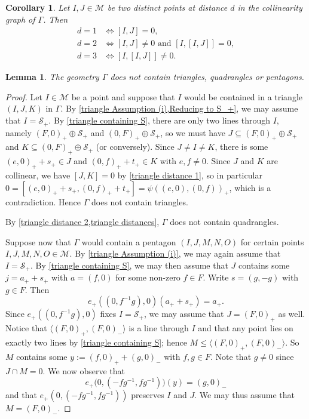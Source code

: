 \documentclass[oneside,a4paper]{amsart} %
\newtheorem{lemma}[theorem]{Lemma}
\newtheorem{corollary}[theorem]{Corollary}
\theoremstyle{definition}
\renewcommand{\SS}{\mathcal{S}}
\newcommand{\M}{\mathcal{M}}
\numberwithin{equation}{section}
\begin{document}
\begin{corollary}
\label{triangle distances}
	Let $I,J\in\M$ be two distinct points at distance $d$ in the collinearity graph of $\Gamma$. Then
	\begin{align*}
	   d = 1 &\iff [I,J]=0, \\
	   d = 2 &\iff [I,J]\neq 0 \text{ and } [I,[I,J]]=0, \\
	   d = 3 &\iff [I,[I,J]]\neq 0.
	\end{align*}
\end{corollary}

\begin{lemma}
\label{triangle no n-gons}
	The geometry $\Gamma$ does not contain triangles, quadrangles or pentagons.
\end{lemma}
\begin{proof}
    Let $I \in \M$ be a point and suppose that $I$ would be contained in a triangle $(I,J,K)$ in $\Gamma$.
    By \cref{triangle Assumption (i),Reducing to S_+}, we may assume that $I = \SS_+$.
	By \cref{triangle containing S}, there are only two lines through $I$, namely $(F,0)_+ \oplus \SS_+$ and $(0,F)_+ \oplus \SS_+$,
	so we must have $J \subseteq (F,0)_+ \oplus \SS_+$ and $K \subseteq (0,F)_+ \oplus \SS_+$ (or conversely).
	Since $J \neq I \neq K$, there is some $(e,0)_+ + s_+ \in J$ and $(0,f)_+ + t_+ \in K$ with $e,f \neq 0$.
	Since $J$ and $K$ are collinear, we have $[J,K] = 0$ by \cref{triangle distance 1}, so in particular
	$0 = [(e,0)_+ + s_+, (0,f)_+ + t_+] = \psi((e,0),(0,f))_+$, which is a contradiction.
	Hence $\Gamma$ does not contain triangles.
	
	By \cref{triangle distance 2,triangle distances}, $\Gamma$ does not contain quadrangles.
	
	Suppose now that $\Gamma$ would contain a pentagon $(I,J,M,N,O)$ for certain points $I,J,M,N,O \in \M$.
	By \cref{triangle Assumption (i)}, we may again assume that $I=\SS_+$.
    By \cref{triangle containing S}, we may then assume that $J$ contains some $j = a_+ + s_+$ with $a=(f,0)$ for some non-zero $f\in F$.
    Write $s=(g,-g)$ with $g\in F$.
    Then
    \[ e_+((0,f^{-1}g),0)(a_++s_+)=a_+ . \]
    Since $e_+((0,f^{-1}g),0)$ fixes $I=\SS_+$, we may assume that $J=(F,0)_+$ as well.
    Notice that $\langle (F,0)_+,(F,0)_-\rangle$ is a line through $I$ and that any point lies on exactly two lines by \cref{triangle containing S}; hence $M\leq \langle (F,0)_+,(F,0)_-\rangle$.
    So $M$ contains some $y:=(f,0)_++(g,0)_-$ with $f, g\in F$.
    Note that $g \neq 0$ since $J \cap M = 0$.
    We now observe that
    \[ e_+ \bigl( 0,(-fg^{-1},fg^{-1}) \bigr)(y) = (g,0)_- \]
    and that $e_+(0,(-fg^{-1},fg^{-1}))$ preserves $I$ and $J$. We may thus assume that $M=(F,0)_-$.
    

\end{proof}
\end{document}
